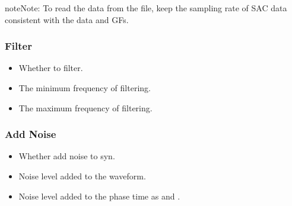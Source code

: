 \documentclass[a4paper,10pt,english,openany]{sphinxmanual}
\begin{document}
\begin{sphinxadmonition}{note}{Note:}
To read the data from the  file, keep the sampling rate of SAC data consistent with the data and GFs.
\end{sphinxadmonition}


\subsubsection{Filter}
\label{\detokenize{tutorials/S2_Syn_Waveform:filter}}
\begin{itemize}
\item {} 
Whether to filter.

\end{itemize}

\begin{itemize}
\item {} 
The minimum frequency of filtering.

\end{itemize}

\begin{itemize}
\item {} 
The maximum frequency of filtering.

\end{itemize}


\subsubsection{Add Noise}
\label{\detokenize{tutorials/S2_Syn_Waveform:add-noise}}
\begin{itemize}
\item {} 
Whether add noise to syn.

\end{itemize}

\begin{itemize}
\item {} 
Noise level added to the waveform.

\end{itemize}

\begin{itemize}
\item {} 
Noise level added to the phase time as  and .

\end{itemize}
\end{document}
